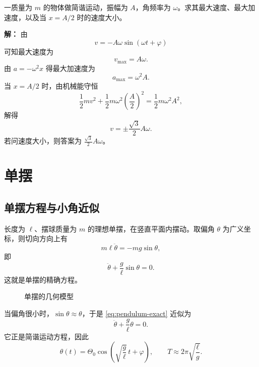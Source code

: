\begin{example}
一质量为 $m$ 的物体做简谐运动，振幅为 $A$，角频率为 $\omega$。求其最大速度、最大加速度，以及当 $x=A/2$ 时的速度大小。

\textbf{解：} 由
\[
v=-A\omega\sin(\omega t+\varphi)
\]
可知最大速度为
\[
v_{\max}=A\omega.
\]
由 $a=-\omega^2x$ 得最大加速度为
\[
a_{\max}=\omega^2A.
\]
当 $x=A/2$ 时，由机械能守恒
\[
\frac12 m v^2+\frac12 m\omega^2\left(\frac{A}{2}\right)^2
=\frac12 m\omega^2A^2,
\]
解得
\[
v=\pm \frac{\sqrt3}{2}A\omega.
\]
若问速度大小，则答案为 $\frac{\sqrt3}{2}A\omega$。
\end{example}

\section{单摆}

\subsection{单摆方程与小角近似}

长度为 $\ell$、摆球质量为 $m$ 的理想单摆，在竖直平面内摆动。取偏角 $\theta$ 为广义坐标，则切向方向上有
\[
m\ell\ddot\theta=-mg\sin\theta,
\]
即
\begin{equation}
\ddot\theta+\frac{g}{\ell}\sin\theta=0.
\label{eq:pendulum-exact}
\end{equation}
这就是单摆的精确方程。

\begin{figure}[H]
\centering
{}
\caption{单摆的几何模型}
\end{figure}

当偏角很小时，$\sin\theta\approx\theta$，于是 \eqref{eq:pendulum-exact} 近似为
\begin{equation}
\ddot\theta+\frac{g}{\ell}\theta=0.
\label{eq:pendulum-small-angle}
\end{equation}
它正是简谐运动方程，因此
\[
\theta(t)=\Theta_0\cos\left(\sqrt{\frac{g}{\ell}}\,t+\varphi\right),
\qquad
T\approx 2\pi\sqrt{\frac{\ell}{g}}.
\]


